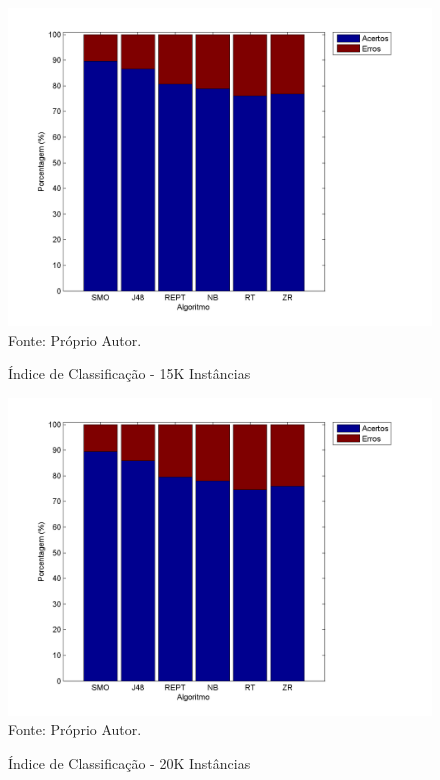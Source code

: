 \documentclass[
	12pt,				%
	openright,			%
	oneside,	
	a4paper,				%
	english,				%
	brazil				%
]{abntex2/abntex2} %
\begin{document}
	\pagebreak
	\clearpage
	\newpage
	
	\begin{figure}[!htb]
		\caption{\label{figperHits15k} Índice de Classificação - 15K Instâncias}
		\begin{center}
			\includegraphics[scale=0.8]{graphs/perc_hits_15k.png}
			Fonte: Próprio Autor.
		\end{center}
	\end{figure}
	
	\begin{figure}[!htb]
		\caption{\label{figperHits20k} Índice de Classificação - 20K Instâncias}
		\begin{center}
			\includegraphics[scale=0.8]{graphs/perc_hits_20k.png}
			Fonte: Próprio Autor.
		\end{center}
	\end{figure}
	
\end{document}
